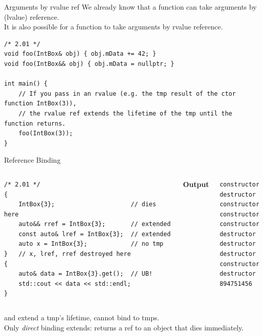 \begin{frame}[fragile]{Arguments by rvalue ref}
  We already know that a function can take arguments by (lvalue) reference.\\
  It is also possible for a function to take arguments by rvalue reference.

  \begin{verbatim}
/* 2.01 */
void foo(IntBox& obj) { obj.mData += 42; }
void foo(IntBox&& obj) { obj.mData = nullptr; }

int main() {
    // If you pass in an rvalue (e.g. the tmp result of the ctor function IntBox(3)),
    // the rvalue ref extends the lifetime of the tmp until the function returns.
    foo(IntBox(3));
}
  \end{verbatim}
\end{frame}

\begin{frame}[fragile]{Reference Binding}
  \begin{columns}[T]
    \begin{verbatim}
/* 2.01 */
{
    IntBox{3};                     // dies here
    auto&& rref = IntBox{3};       // extended
    const auto& lref = IntBox{3};  // extended
    auto x = IntBox{3};            // no tmp
}   // x, lref, rref destroyed here
{
    auto& data = IntBox{3}.get();  // UB!
    std::cout << data << std::endl;
}
    \end{verbatim}

    \textbf{Output}
    \begin{verbatim}
constructor
destructor
constructor
constructor
constructor
destructor
destructor
destructor
constructor
destructor
894751456
    \end{verbatim}
  \end{columns}

  \begin{sqt:result}
     and  extend a tmp's lifetime,  cannot bind to tmps.\\
    Only \emph{direct} binding extends:  returns a ref to an object that dies immediately.
  \end{sqt:result}
\end{frame}

